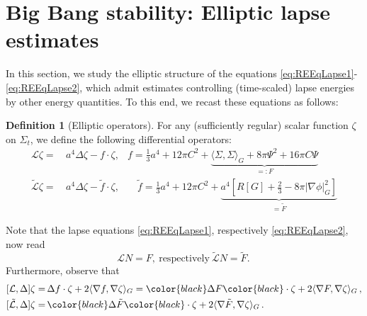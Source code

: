 \documentclass[11pt,leqno,textwidth=10cm]{amsart}
\numberwithin{equation}{section}
\theoremstyle{definition}
\newtheorem{definition}{Definition}[section]
\theoremstyle{plain}
\newcommand{\1}{\mathbbm{1}}
\renewcommand{\L}{\mathcal{L}}
\newcommand{\Ric}{\text{\normalfont{Ric}}}
\newcommand{\Lap}{\Delta}
\newcommand{\Ltilde}{\tilde{\L}}
\newcommand{\change}[1]{\color{black}#1\color{black}}
\begin{document}
\section{Big Bang stability: Elliptic lapse estimates}\label{sec:lapse}

In this section, we study the elliptic structure of the equations \eqref{eq:REEqLapse1}-\eqref{eq:REEqLapse2}, which admit estimates controlling (time-scaled) lapse energies by other energy quantities. To this end, we recast these equations as follows:


\begin{definition}[Elliptic operators] For any (sufficiently regular) scalar function $\zeta$ on $\Sigma_t$, we define the following differential operators:
\begin{subequations}
\begin{align}
\L \zeta=&\,a^4\Lap \zeta-f\cdot \zeta,&f=\frac13a^4+12\pi C^2+\underbrace{\langle\Sigma,\Sigma\rangle_G+8\pi\Psi^2+16\pi C\Psi}_{=:F} \\
\Ltilde \zeta=&\,a^4\Lap\zeta-\tilde{f}\cdot\zeta,&\quad \tilde{f}=\frac13a^4+12\pi C^2+\underbrace{a^4\left[R[G]+\frac23-8\pi\lvert\nabla\phi\rvert^2_G\right]}_{=\tilde{F}}
\end{align}
\end{subequations}
\end{definition}
\noindent Note that the lapse equations \eqref{eq:REEqLapse1}, respectively \eqref{eq:REEqLapse2}, now read
\begin{equation}\label{eq:lapse-with-op}
\L N=F,\ \text{respectively}\ \Ltilde N=\tilde{F}.\,
\end{equation}
Furthermore, observe that
\begin{subequations}
\begin{align}
\label{eq:[L,Lap]}[\L,\Lap]\zeta=&\,\Lap f\cdot\zeta+2\langle\nabla f,\nabla\zeta\rangle_G=\change{\Lap F}\cdot\zeta+2\langle\nabla F,\nabla\zeta\rangle_G\,,\\
\label{eq:[Ltilde,Lap]}[\Ltilde,\Lap]\zeta=&\,\change{\Lap \tilde{F}}\cdot\zeta+2\langle\nabla \tilde{F},\nabla\zeta\rangle_G\,.
\end{align}
\end{subequations}
\end{document}
